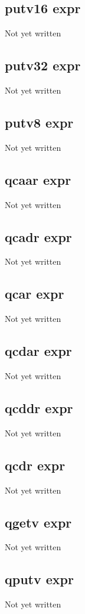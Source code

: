 \documentclass[a4paper,11pt]{article}
\begin{document}
{\subsection{\ttfamily putv16 expr}
Not yet written

\subsection{\ttfamily putv32 expr}
Not yet written

\subsection{\ttfamily putv8 expr}
Not yet written

\subsection{\ttfamily qcaar expr}
Not yet written

\subsection{\ttfamily qcadr expr}
Not yet written

\subsection{\ttfamily qcar expr}
Not yet written

\subsection{\ttfamily qcdar expr}
Not yet written

\subsection{\ttfamily qcddr expr}
Not yet written

\subsection{\ttfamily qcdr expr}
Not yet written

\subsection{\ttfamily qgetv expr}
Not yet written

\subsection{\ttfamily qputv expr}
Not yet written

}
\end{document}
